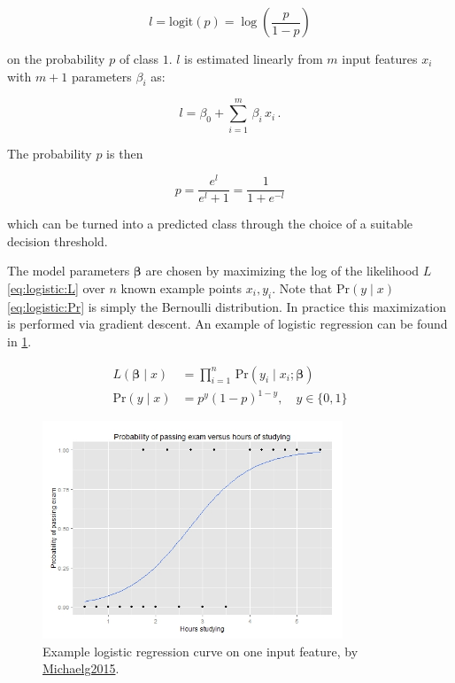 \begin{equation}\label{eq:logistic:logic}
l = \text{logit}\left(p\right) = \log\left(\frac{p}{1-p}\right)
\end{equation}

\noindent on the probability $p$ of class $1$.
$l$ is estimated linearly from $m$ input features $x_{i}$ with $m+1$ parameters $\beta_{i}$ as:

\begin{equation}\label{eq:logistic:logicBeta}
l = \beta_{0} + \sum_{i=1}^{m} \, \beta_{i}\,x_{i}\,.
\end{equation}

\noindent The probability $p$ is then

\begin{equation}\label{eq:logistic:p}
p = \frac{e^l}{e^l + 1} = \frac{1}{1+e^{-l}}
\end{equation}

\noindent which can be turned into a predicted class through the choice of a suitable decision threshold.

The model parameters $\bm{\beta}$ are chosen by maximizing
the log of the likelihood $L$ \cref{eq:logistic:L} over $n$ known example points $x_{i}, y_{i}$.
Note that $\mathrm{Pr}\left(y \mid x\right)$ \cref{eq:logistic:Pr} is simply the Bernoulli distribution.
In practice this maximization is performed via gradient descent.
An example of logistic regression can be found in \cref{fig:logistic_regression_ex}.

\begin{subequations} \label{eq:logistic:L_Pr}
\begin{align}
L\left(\bm{\beta} \mid x\right) &= \prod_{i=1}^{n} \, \mathrm{Pr}\left(y_{i} \mid x_{i}; \bm{\beta}\right) \label{eq:logistic:L} \\
\mathrm{Pr}\left(y \mid x\right) &= p^y\left(1-p\right)^{1-y}, \quad y \in \{0, 1\} \label{eq:logistic:Pr}
\end{align}
\end{subequations}

\begin{figure}
\centering
\includegraphics[width=0.8\textwidth]{figures/regression/Exam_pass_logistic_curve.jpeg}
\caption{
Example logistic regression curve on one input feature, by \href{https://en.wikipedia.org/wiki/File:Exam_pass_logistic_curve.jpeg}{Michaelg2015}.
}
\label{fig:logistic_regression_ex}
\end{figure}

